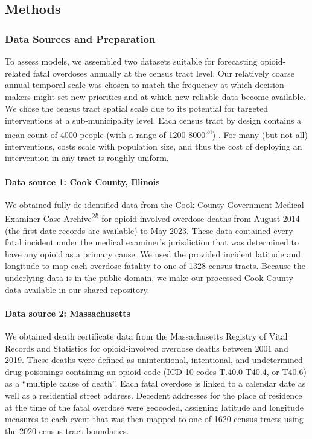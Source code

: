 \subsection{Methods}\label{methods}

\subsubsection{Data Sources and Preparation}\label{data-sources-and-preparation}

To assess models, we assembled two datasets suitable for forecasting opioid-related fatal overdoses annually at the census tract level. Our relatively coarse annual temporal scale was chosen to match the frequency at which decision-makers might set new priorities and at which new reliable data become available. We chose the census tract spatial scale due to its potential for targeted interventions at a sub-municipality level. Each census tract by design contains a mean count of 4000 people (with a range of 1200-8000\textsuperscript{24}) . For many (but not all) interventions, costs scale with population size, and thus the cost of deploying an intervention in any tract is roughly uniform.

\paragraph{\texorpdfstring{Data source 1: Cook County, Illinois }{Data source 1: Cook County, Illinois }}\label{data-source-1-cook-county-illinois}

We obtained fully de-identified data from the Cook County Government Medical Examiner Case Archive\textsuperscript{25} for opioid-involved overdose deaths from August 2014 (the first date records are available) to May 2023. These data contained every fatal incident under the medical examiner's jurisdiction that was determined to have any opioid as a primary cause. We used the provided incident latitude and longitude to map each overdose fatality to one of 1328 census tracts. Because the underlying data is in the public domain, we make our processed Cook County data available in our shared repository.

\paragraph{Data source 2: Massachusetts}\label{data-source-2-massachusetts}

We obtained death certificate data from the Massachusetts Registry of Vital Records and Statistics for opioid-involved overdose deaths between 2001 and 2019. These deaths were defined as unintentional, intentional, and undetermined drug poisonings containing an opioid code (ICD-10 codes T.40.0-T40.4, or T40.6) as a ``multiple cause of death''. Each fatal overdose is linked to a calendar date as well as a residential street address. Decedent addresses for the place of residence at the time of the fatal overdose were geocoded, assigning latitude and longitude measures to each event that was then mapped to one of 1620 census tracts using the 2020 census tract boundaries.

